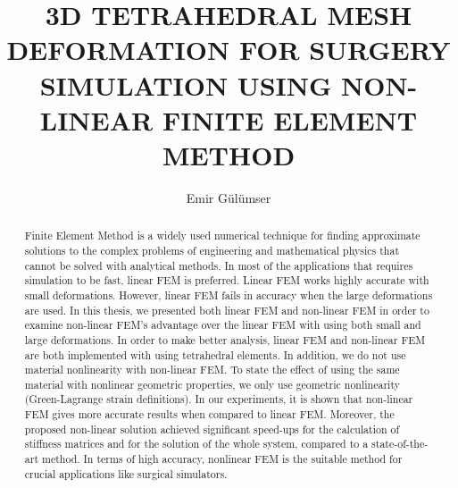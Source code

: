\documentclass{buthesis}
\title{3D TETRAHEDRAL MESH DEFORMATION FOR SURGERY SIMULATION USING NON-LINEAR FINITE ELEMENT METHOD}
\author{Emir G{\"u}l{\"u}mser}
\begin{document}
\titlepageMS
\signaturepageMS
\begin{abstract}
\indent Finite Element Method is a widely used numerical technique for finding approximate solutions to the complex problems of engineering and mathematical physics that cannot be solved with analytical methods. In most of the applications that requires simulation to be fast, linear FEM is preferred. Linear FEM works highly accurate with small deformations. However, linear FEM fails in accuracy when the large deformations are used. In this thesis, we presented both linear FEM and non-linear FEM in order to examine non-linear FEM's advantage over the linear FEM with using both small and large deformations. In order to make better analysis, linear FEM and non-linear FEM are both implemented with using tetrahedral elements. In addition, we do not use material nonlinearity with non-linear FEM. To state the effect of using the same material with nonlinear geometric properties, we only use geometric nonlinearity (Green-Lagrange strain definitions). In our experiments, it is shown that non-linear FEM gives more accurate results when compared to linear FEM. Moreover, the proposed non-linear solution achieved significant speed-ups for the calculation of stiffness matrices and for the solution of the whole system, compared to a state-of-the-art method. In terms of high accuracy, nonlinear FEM is the suitable method for crucial applications like surgical simulators.
\end{abstract}
\end{document}
